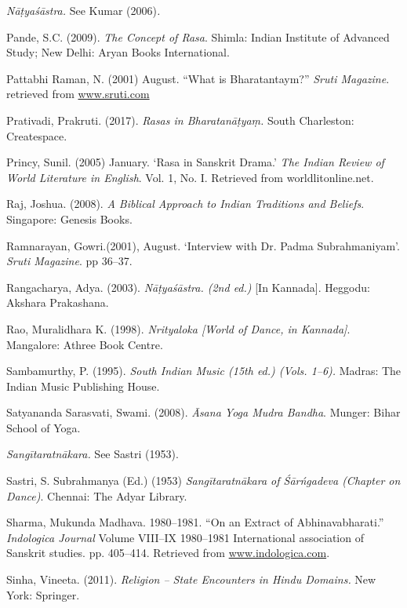 \begin{thebibliography}{99}
  \textit{Nāṭyaśāstra. }See Kumar (2006)\textit{.}

  Pande, S.C. (2009). \textit{The Concept of Rasa}. Shimla: Indian Institute of Advanced Study; New Delhi: Aryan Books International.

  Pattabhi Raman, N. (2001) August. “What is Bharatantaym?” \textit{Sruti Magazine}. retrieved from \url{www.sruti.com}

  Prativadi, Prakruti. (2017). \textit{Rasas in Bharatanāṭyaṃ. }South Charleston: Createspace.

  Princy, Sunil. (2005) January. ‘Rasa in Sanskrit Drama.’ \textit{The Indian Review of World Literature in English}. Vol. 1, No. I. Retrieved from worldlitonline.net.

  Raj, Joshua. (2008). \textit{A Biblical Approach to Indian Traditions and Beliefs}. Singapore: Genesis Books.

  Ramnarayan, Gowri.(2001), August. ‘Interview with Dr. Padma Subrahmaniyam’. \textit{Sruti Magazine}. pp 36–37.

  Rangacharya, Adya. (2003). \textit{Nāṭyaśāstra. (2nd ed.) }[In Kannada]. Heggodu: Akshara Prakashana.

  Rao, Muralidhara K. (1998). \textit{Nrityaloka [World of Dance, in Kannada]}. Mangalore: Athree Book Centre.

  Sambamurthy, P. (1995). \textit{South Indian Music (15th ed.) (Vols. 1–6). }Madras: The Indian Music Publishing House.

  Satyananda Sarasvati, Swami. (2008). \textit{Āsana Yoga Mudra Bandha}. Munger: Bihar School of Yoga.

  \textit{Sangītaratnākara. }See\textit{ }Sastri (1953).

  Sastri, S. Subrahmanya (Ed.) (1953) \textit{Sangītaratnākara of Śārńgadeva (Chapter on Dance)}. Chennai: The Adyar Library.

  Sharma, Mukunda Madhava. 1980–1981. “On an Extract of Abhinavabharati.” \textit{Indologica Journal} Volume VIII–IX 1980–1981 International association of Sanskrit studies. pp. 405–414. Retrieved from \url{www.indologica.com}.

  Sinha, Vineeta. (2011). \textit{Religion – State Encounters in Hindu Domains.} New York: Springer.


\end{thebibliography}
